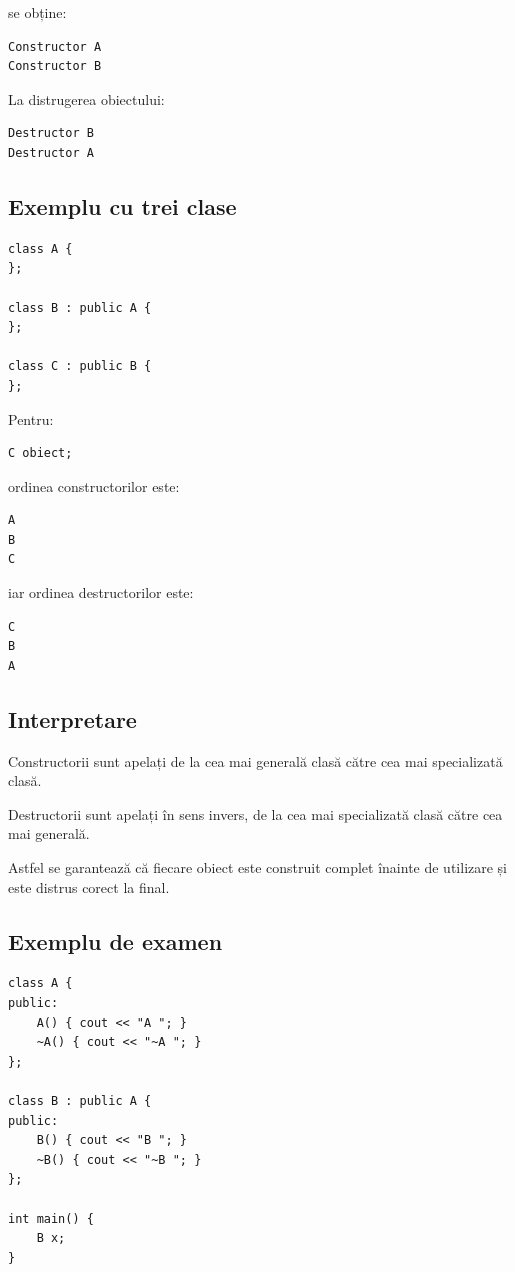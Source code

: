 \documentclass[12pt,a4paper]{article}
\begin{document}
se obține:

\begin{verbatim}
Constructor A
Constructor B
\end{verbatim}

La distrugerea obiectului:

\begin{verbatim}
Destructor B
Destructor A
\end{verbatim}

\subsection{Exemplu cu trei clase}

\begin{verbatim}
class A {
};

class B : public A {
};

class C : public B {
};
\end{verbatim}

Pentru:

\begin{verbatim}
C obiect;
\end{verbatim}

ordinea constructorilor este:

\begin{verbatim}
A
B
C
\end{verbatim}

iar ordinea destructorilor este:

\begin{verbatim}
C
B
A
\end{verbatim}

\subsection{Interpretare}

Constructorii sunt apelați de la cea mai generală clasă către cea mai specializată clasă.

Destructorii sunt apelați în sens invers, de la cea mai specializată clasă către cea mai generală.

Astfel se garantează că fiecare obiect este construit complet înainte de utilizare și este distrus corect la final.

\subsection{Exemplu de examen}

\begin{verbatim}
class A {
public:
    A() { cout << "A "; }
    ~A() { cout << "~A "; }
};

class B : public A {
public:
    B() { cout << "B "; }
    ~B() { cout << "~B "; }
};

int main() {
    B x;
}
\end{verbatim}
\end{document}
